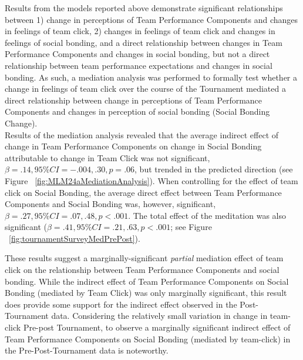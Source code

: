\begin{CJK}{UTF8}{gbsn}

  Results from the models reported above demonstrate significant relationships between 1) change in perceptions of Team Performance Components and changes in feelings of team click, 2) changes in feelings of team click and changes in feelings of social bonding, and a direct relationship between changes in Team Performance Components and changes in social bonding, but not a direct relationship between team performance expectations and changes in social bonding. As such, a mediation analysis was performed to formally test whether a change in feelings of team click over the course of the Tournament mediated a direct relationship between change in perceptions of Team Performance Components and changes in perception of social bonding (Social Bonding Change).\\

  Results of the mediation analysis revealed that the average indirect effect of change in Team Performance Components on change in Social Bonding attributable to change in Team Click was not significant, $\beta = .14, 95\% CI = -.004 , .30, p = .06$, but trended in the predicted direction (see Figure ~\ref{fig:MLM24aMediationAnalysis}).  When controlling for the effect of team click on Social Bonding, the average direct effect between Team Performance Components and Social Bonding was, however, significant, $\beta = .27, 95\% CI = .07 , .48, p < .001$.  The total effect of the meditation was also significant ($\beta = .41, 95\% CI = .21 , .63, p < .001$; see Figure ~\ref{fig:tournamentSurveyMedPrePost}).

  These results suggest a marginally-significant \textit{partial} mediation effect of team click on the relationship between Team Performance Components and social bonding.  While the indirect effect of Team Performance Components on Social Bonding (mediated by Team Click) was only marginally significant, this result does provide some support for the indirect effect observed in the Post-Tournament data.  Considering the relatively small variation in change in team-click Pre-post Tournament, to observe a marginally significant indirect effect of Team Performance Components on Social Bonding (mediated by team-click) in the Pre-Post-Tournament data is noteworthy.




\end{CJK}
